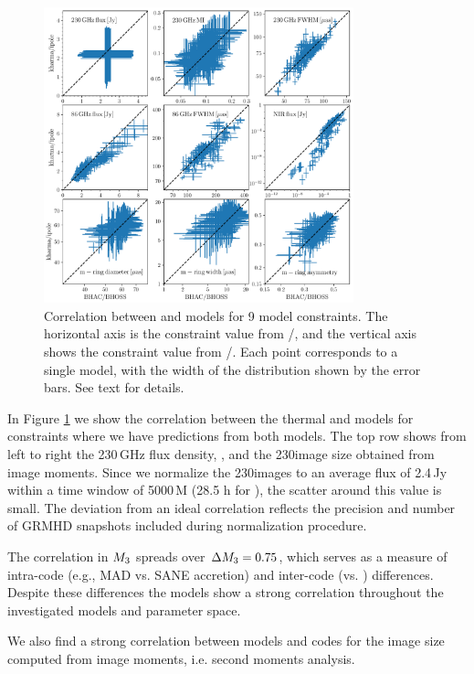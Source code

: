 \begin{figure}
  \centering
  \includegraphics[width=0.8\textwidth]{./figures/BHAC_iharm_correlationNew}
  \caption{Correlation between \bhac and \kharma models for 9 model constraints.
The horizontal axis is the constraint value from \bhac/\bhoss, and the vertical axis shows the constraint value from \kharma/\ipole.
Each point corresponds to a single model, with the width of the distribution shown by the error bars.
See text for details.}
  \label{fig:modelcorrelation}
\end{figure}

In Figure \ref{fig:modelcorrelation} we show the correlation between the thermal \kharma and \bhac models for constraints where we have predictions from both models.
The top row shows from left to right the 230\,GHz flux density, , and the 230\GHz image size obtained from image moments.
Since we normalize the 230\GHz images to an average flux of 2.4\,Jy within a time window of 5000\,M (28.5 h for \sgra), the scatter around this value is small.
The deviation from an ideal correlation reflects the precision and number of GRMHD snapshots included during normalization procedure.

The correlation in $M_{3}$ spreads over $\Delta M_{3}=0.75$, which serves as a measure of intra-code (e.g., MAD vs. SANE accretion) and inter-code (\bhac vs. \kharma) differences.
Despite these differences the models show a strong correlation throughout the investigated models and parameter space.



We also find a strong correlation between models and codes for the image size computed from image moments, i.e. second moments analysis.

